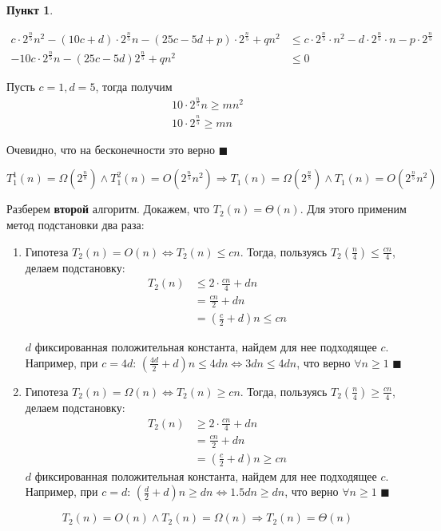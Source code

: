 \documentclass[11pt,a4paper]{scrarticle}
\theoremstyle{definition}
\newtheorem{subtask}{Пункт}
\begin{document}
\begin{subtask}
\begin{enumerate}
		      \begin{align*}
			      c \cdot 2^\frac{n}{5} n^2 - (10c + d) \cdot 2^\frac{n}{5} n - (25c - 5d + p) \cdot 2^\frac{n}{5} + qn^2 & \leq c \cdot 2^\frac{n}{5} \cdot n^2 - d \cdot 2^\frac{n}{5} \cdot n - p \cdot 2^\frac{n}{5} \\
			      -10c \cdot 2^\frac{n}{5} n - (25 c - 5d) 2^\frac{n}{5} + qn^2                                           & \leq 0
		      \end{align*}

		      Пусть $c = 1, d = 5$, тогда получим
		      \begin{align*}
			      10 \cdot 2^\frac{n}{5} n \geq mn^2 \\
			      10 \cdot 2^\frac{n}{5} \geq mn
		      \end{align*}

		      Очевидно, что на бесконечности это верно $\blacksquare$
	\end{enumerate}
	$$
		T_1^1(n) = \Omega(2^\frac{n}{8}) \wedge T_1^2(n) = O(2^\frac{n}{5}n^2) \Rightarrow T_1(n) = \Omega(2^\frac{n}{8}) \wedge T_1(n) = O(2^\frac{n}{5}n^2)
	$$
	\pagebreak

	Разберем \textbf{второй} алгоритм. Докажем, что $T_2(n) = \Theta(n)$. Для этого применим метод подстановки два раза:

	\begin{enumerate}
		\item Гипотеза $T_2(n) = O(n) \Leftrightarrow T_2(n) \leq cn$. Тогда, пользуясь
		      $T_2\left(\frac{n}{4}\right) \leq \frac{cn}{4}$, делаем подстановку:
		      \begin{align*}
			      T_2(n) & \leq 2 \cdot \frac{cn}{4} + dn           \\
			             & = \frac{cn}{2} + dn                      \\
			             & = \left(\frac{c}{2} + d\right) n \leq cn
		      \end{align*}

		      $d$ фиксированная положительная константа, найдем для нее подходящее $c$.
		      Например, при $c = 4d$: $\left(\frac{4d}{2} + d\right) n \leq 4dn \Leftrightarrow 3d n \leq 4d n$, что верно $\forall n \geq 1$ $\blacksquare$
		\item Гипотеза $T_2(n) = \Omega(n) \Leftrightarrow T_2(n) \geq cn$. Тогда, пользуясь
		      $T_2\left(\frac{n}{4}\right) \geq \frac{cn}{4}$, делаем подстановку:
		      \begin{align*}
			      T_2(n) & \geq 2 \cdot \frac{cn}{4} + dn           \\
			             & = \frac{cn}{2} + dn                      \\
			             & = \left(\frac{c}{2} + d\right) n \geq cn
		      \end{align*}
		      $d$ фиксированная положительная константа, найдем для нее подходящее $c$.
		      Например, при $c = d$: $\left(\frac{d}{2} + d\right) n \geq dn \Leftrightarrow 1.5d n \geq d n$, что верно $\forall n \geq 1$ $\blacksquare$
	\end{enumerate}

	$$
		T_2(n) = O(n) \land T_2(n) = \Omega(n) \Longrightarrow T_2(n) = \Theta(n)
	$$
\end{subtask}
\end{document}
